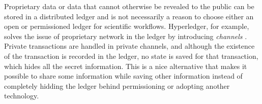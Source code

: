 Proprietary data or data that cannot otherwise be revealed to the public can be
stored in a distributed ledger and is not necessarily a reason to choose either
an open or permissioned ledger for scientific workflows. Hyperledger, for
example, solves the issue of proprietary network in the ledger by introducing
\textit{channels} \cite{noauthor_hyperledger_nodate}. Private transactions are
handled in private channels, and although the existence of the transaction is
recorded in the ledger, no state is saved for that transaction, which hides all
the secret information. This is a nice alternative that makes it possible to
share some information while saving other information instead of completely
hidding the ledger behind permissioning or adopting another technology.